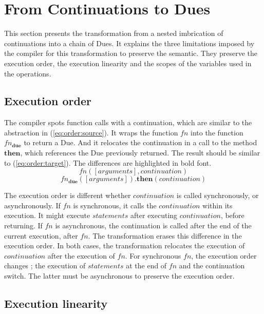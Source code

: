 \section{From Continuations to Dues} \label{chapter5:equivalence}

This section presents the transformation from a nested imbrication of continuations into a chain of Dues.
It explains the three limitations imposed by the compiler for this transformation to preserve the semantic.
They preserve the execution order, the execution linearity and the scopes of the variables used in the operations.

\subsection{Execution order}

The compiler spots function calls with a continuation, which are similar to the abstraction in (\ref{eq:order:source}).
It wraps the function $fn$ into the function $fn_\textbf{due}$ to return a Due.
And it relocates the continuation in a call to the method $\textbf{then}$, which references the Due previously returned.
The result should be similar to (\ref{eq:order:target}).
The differences are highlighted in bold font.
\begin{equation} \label{eq:order:source}
fn([arguments], continuation)
\end{equation}
\begin{equation} \label{eq:order:target}
fn_\textbf{due}([arguments])\textbf{.then}(continuation)
\end{equation}

The execution order is different whether $continuation$ is called synchronously, or asynchronously.
If $fn$ is synchronous, it calls the $continuation$ within its execution.
It might execute $statements$ after executing $continuation$, before returning.
If $fn$ is asynchronous, the continuation is called after the end of the current execution, after $fn$.
The transformation erases this difference in the execution order.
In both cases, the transformation relocates the execution of $continuation$ after the execution of $fn$.
For synchronous $fn$, the execution order changes ; the execution of $statements$ at the end of $fn$ and the continuation switch.
The latter must be asynchronous to preserve the execution order.

\subsection{Execution linearity}

